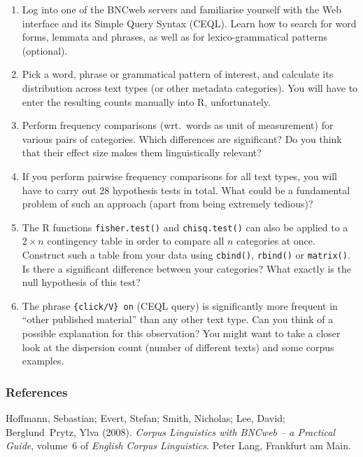 \documentclass[a4paper,12pt]{article}
\begin{document}
\begin{enumerate}
\item Log into one of the BNCweb servers and familiarise yourself with the Web
  interface and its Simple Query Syntax (CEQL).  Learn how to search for word forms,
  lemmata and phrases, as well as for lexico-grammatical patterns (optional).
\item Pick a word, phrase or grammatical pattern of interest, and calculate
  its distribution across text types (or other metadata categories).  You will
  have to enter the resulting counts manually into R, unfortunately.
\item Perform frequency comparisons (wrt.\ words as unit of measurement) for
  various pairs of categories.  Which differences are significant?  Do you
  think that their effect size makes them linguistically relevant?
\item If you perform pairwise frequency comparisons for all text types, you
  will have to carry out 28 hypothesis tests in total.  What could be a
  fundamental problem of such an approach (apart from being extremely
  tedious)?
\item The R functions \texttt{fisher.test()} and \texttt{chisq.test()} can
  also be applied to a $2\times n$ contingency table in order to compare all
  $n$ categories at once.  Construct such a table from your data using
  \texttt{cbind()}, \texttt{rbind()} or \texttt{matrix()}.  Is there a
  significant difference between your categories?  What exactly is the
  null hypothesis of this test?
\item The phrase \verb_{click/V} on_ (CEQL query) is significantly more
  frequent in ``other published material'' than any other text type.  Can you
  think of a possible explanation for this observation?  You might want to
  take a closer look at the dispersion count (number of different texts) and
  some corpus examples.
\end{enumerate}

\subsubsection*{References}

Hoffmann, Sebastian; Evert, Stefan; Smith, Nicholas; Lee, David; Berglund~Prytz, Ylva (2008).
{\em Corpus Linguistics with {BNCweb} -- a Practical Guide}, volume~6 of {\em English Corpus Linguistics}.
Peter Lang, Frankfurt am Main.
\end{document}
